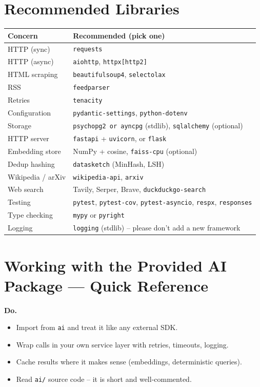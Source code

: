 \documentclass[11pt,a4paper]{article}
\begin{document}
\section{Recommended Libraries}
\begin{center}\small
\begin{tabular}{ll}
\toprule
\textbf{Concern} & \textbf{Recommended (pick one)} \\
\midrule
HTTP (sync) & \texttt{requests} \\
HTTP (async) & \texttt{aiohttp}, \texttt{httpx[http2]} \\
HTML scraping & \texttt{beautifulsoup4}, \texttt{selectolax} \\
RSS & \texttt{feedparser} \\
Retries & \texttt{tenacity} \\
Configuration & \texttt{pydantic-settings}, \texttt{python-dotenv} \\
Storage & \texttt{psychopg2 or ayncpg} (stdlib), \texttt{sqlalchemy} (optional) \\
HTTP server & \texttt{fastapi} + \texttt{uvicorn}, or \texttt{flask} \\
Embedding store & NumPy + cosine, \texttt{faiss-cpu} (optional) \\
Dedup hashing & \texttt{datasketch} (MinHash, LSH) \\
Wikipedia / arXiv & \texttt{wikipedia-api}, \texttt{arxiv} \\
Web search & Tavily, Serper, Brave, \texttt{duckduckgo-search} \\
Testing & \texttt{pytest}, \texttt{pytest-cov}, \texttt{pytest-asyncio}, \texttt{respx}, \texttt{responses} \\
Type checking & \texttt{mypy} or \texttt{pyright} \\
Logging & \texttt{logging} (stdlib) -- please don't add a new framework \\
\bottomrule
\end{tabular}
\end{center}

\section{Working with the Provided AI Package --- Quick Reference}
\textbf{Do.}
\begin{itemize}[topsep=2pt,itemsep=1pt]
  \item Import from \texttt{ai} and treat it like any external SDK.
  \item Wrap calls in your own service layer with retries, timeouts, logging.
  \item Cache results where it makes sense (embeddings, deterministic queries).
  \item Read \texttt{ai/} source code -- it is short and well-commented.
\end{itemize}
\end{document}
